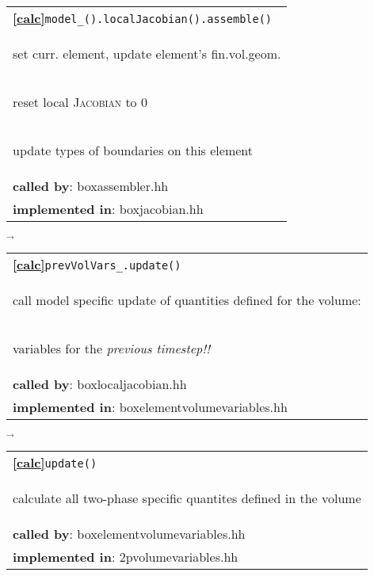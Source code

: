 \begin{landscape}
{\begin{tabular}{|l|}
      \hline
     \textbf{\textcircled{\ref{calc}}}\verb+model_().localJacobian().assemble()+ \\
     \begin{scriptsize}set curr. element, update element's fin.vol.geom.\end{scriptsize}\\
     \begin{scriptsize}reset local \textsc{Jacobian} to 0\end{scriptsize}\\
     \begin{scriptsize}update types of boundaries on this element\end{scriptsize}\\
      \textbf{called by}: boxassembler.hh\\
      \textbf{implemented in}:  boxjacobian.hh\\  
	\hline
  \end{tabular}
    $\overrightarrow{
    }$
    \begin{tabular}{|l|}
      \hline
      \textbf{\textcircled{\ref{calc}}}\verb+prevVolVars_.update()+ \\
    \begin{scriptsize}call model specific update of quantities defined for the volume:\end{scriptsize}\\
    \begin{scriptsize}variables for the \emph{previous timestep!!}\end{scriptsize}\\
      \textbf{called by}: boxlocaljacobian.hh\\
      \textbf{implemented in}: boxelementvolumevariables.hh\\  
	\hline
  \end{tabular}
\nextline
    $\overrightarrow{
    }$
    \begin{tabular}{||l||}
      \hline\hline
      \textbf{\textcircled{\ref{calc}}}\verb+update()+ \\
    \begin{scriptsize}calculate all two-phase specific quantites defined in the volume\end{scriptsize}\\
      \textbf{called by}: boxelementvolumevariables.hh\\
      \textbf{implemented in}: 2pvolumevariables.hh\\  
	\hline\hline
  \end{tabular}
}
\end{landscape}
